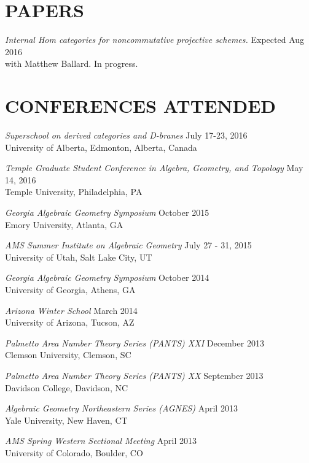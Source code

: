 \documentclass[line,overlapped]{res}
\begin{document}
\begin{resume}
 \section{PAPERS}
         {\sl  Internal Hom categories for noncommutative projective schemes.} \hfill Expected Aug 2016\\
	 with Matthew Ballard.  In progress.

 \newpage

 \section{CONFERENCES ATTENDED}
	 {\sl Superschool on derived categories and D-branes} \hfill July 17-23, 2016\\
	 University of Alberta, Edmonton, Alberta, Canada

         {\sl Temple Graduate Student Conference in Algebra, Geometry, and Topology} \hfill May 14, 2016\\
         Temple University, Philadelphia, PA
         
         {\sl Georgia Algebraic Geometry Symposium} \hfill October 2015\\
         Emory University, Atlanta, GA

         {\sl AMS Summer Institute on Algebraic Geometry} \hfill July 27 - 31, 2015\\
         University of Utah, Salt Lake City, UT

         {\sl Georgia Algebraic Geometry Symposium} \hfill October 2014\\
         University of Georgia, Athens, GA

         {\sl Arizona Winter School} \hfill March 2014\\
         University of Arizona, Tucson, AZ

         {\sl Palmetto Area Number Theory Series (PANTS) XXI} \hfill December 2013\\
         Clemson University, Clemson, SC

         {\sl Palmetto Area Number Theory Series (PANTS) XX} \hfill September 2013\\
         Davidson College, Davidson, NC

         {\sl Algebraic Geometry Northeastern Series (AGNES)} \hfill April 2013\\
         Yale University, New Haven, CT

         {\sl AMS Spring Western Sectional Meeting} \hfill April 2013\\
         University of Colorado, Boulder, CO


\end{resume}
\end{document}
